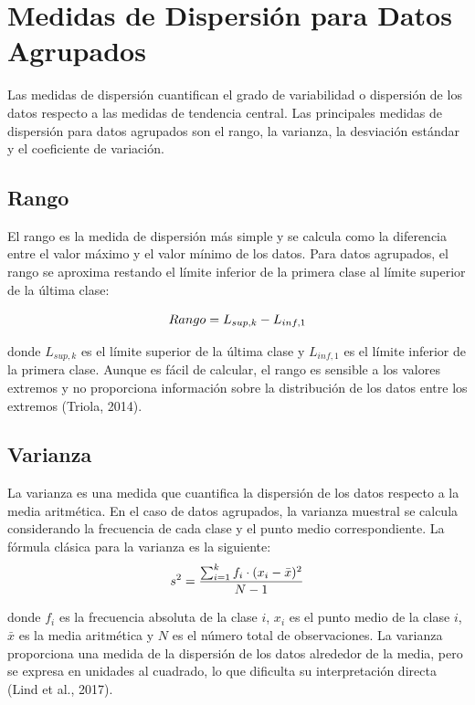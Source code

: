 \documentclass[
  spanish,
  letterpaper,
]{book}
\begin{document}
\section{Medidas de Dispersión para Datos
Agrupados}\label{medidas-de-dispersiuxf3n-para-datos-agrupados}

Las medidas de dispersión cuantifican el grado de variabilidad o
dispersión de los datos respecto a las medidas de tendencia central. Las
principales medidas de dispersión para datos agrupados son el rango, la
varianza, la desviación estándar y el coeficiente de variación.

\subsection{Rango}\label{rango-2}

El rango es la medida de dispersión más simple y se calcula como la
diferencia entre el valor máximo y el valor mínimo de los datos. Para
datos agrupados, el rango se aproxima restando el límite inferior de la
primera clase al límite superior de la última clase:

\[\huge Rango = L_{sup,k} - L_{inf,1}\]

donde \(L_{sup,k}\)\hspace{0pt} es el límite superior de la última clase
y \(L_{inf,1}\) es el límite inferior de la primera clase. Aunque es
fácil de calcular, el rango es sensible a los valores extremos y no
proporciona información sobre la distribución de los datos entre los
extremos (Triola, 2014).

\subsection{Varianza}\label{varianza-2}

La varianza es una medida que cuantifica la dispersión de los datos
respecto a la media aritmética. En el caso de datos agrupados, la
varianza muestral se calcula considerando la frecuencia de cada clase y
el punto medio correspondiente. La fórmula clásica para la varianza es
la siguiente:\\
\[\huge s^2 = \frac{\sum_{i=1}^{k} f_i \cdot (x_i - \bar{x})^2}{N - 1}\]

donde \(f_i\)\hspace{0pt} es la frecuencia absoluta de la clase \(i\),
\(x_i\)\hspace{0pt} es el punto medio de la clase \(i\), \(\bar{x}\) es
la media aritmética y \(N\) es el número total de observaciones. La
varianza proporciona una medida de la dispersión de los datos alrededor
de la media, pero se expresa en unidades al cuadrado, lo que dificulta
su interpretación directa (Lind et al., 2017).
\end{document}
